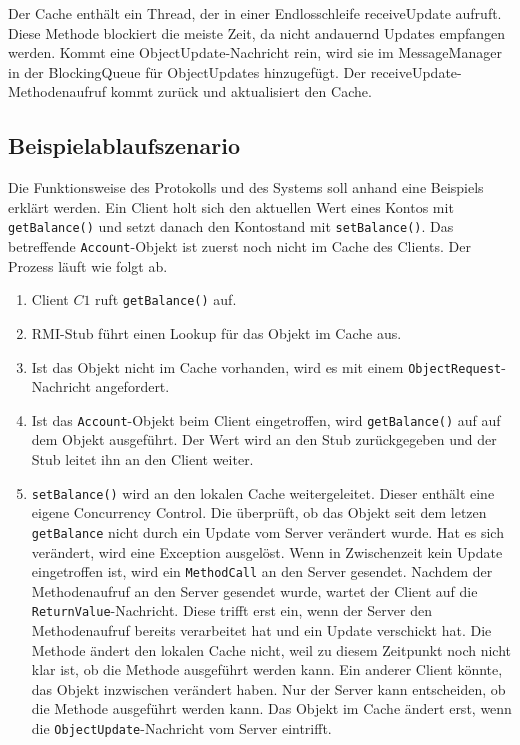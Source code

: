 Der Cache enthält ein Thread, der in einer Endlosschleife receiveUpdate aufruft. Diese Methode blockiert die meiste Zeit, da nicht andauernd Updates empfangen werden. Kommt eine ObjectUpdate-Nachricht rein, wird sie im MessageManager in der BlockingQueue für ObjectUpdates hinzugefügt. Der receiveUpdate-Methodenaufruf kommt zurück und aktualisiert den Cache.

\subsection{Beispielablaufszenario}
\label{sec:beisp}

Die Funktionsweise des Protokolls und des Systems soll anhand eine Beispiels erklärt werden. Ein Client holt sich den aktuellen Wert eines Kontos mit \texttt{getBalance()} und setzt danach den Kontostand mit \texttt{setBalance()}. Das betreffende \texttt{Account}-Objekt ist zuerst noch nicht im Cache des Clients. Der Prozess läuft wie folgt ab.

\begin{enumerate}
\item Client $C1$ ruft \verb+getBalance()+ auf.
\item RMI-Stub führt einen Lookup für das Objekt im Cache aus.
\item Ist das Objekt nicht im Cache vorhanden, wird es mit einem \texttt{Object\-Request}-Nachricht angefordert.
\item Ist das \texttt{Account}-Objekt beim Client eingetroffen, wird \verb+getBalance()+ auf auf dem Objekt ausgeführt. Der Wert wird an den Stub zurück\-gegeben und der Stub leitet ihn an den Client weiter.
\item \verb+setBalance()+ wird an den lokalen Cache weitergeleitet. Dieser enthält eine eigene Concurrency Control. Die überprüft, ob das Objekt seit dem letzen \verb+getBalance+ nicht durch ein Update vom Server verändert wurde. Hat es sich verändert, wird eine Exception ausgelöst. Wenn in Zwischenzeit kein Update eingetroffen ist, wird ein \texttt{MethodCall} an den Server gesendet. Nachdem der Methodenaufruf an den Server gesendet wurde, wartet der Client auf die \texttt{ReturnValue}-Nachricht. Diese trifft erst ein, wenn der Server den Methodenaufruf bereits verarbeitet hat und ein Update verschickt hat. Die Methode ändert den lokalen Cache nicht, weil zu diesem Zeitpunkt noch nicht klar ist, ob die Methode ausgeführt werden kann. Ein anderer Client könnte, das Objekt inzwischen verändert haben. Nur der Server kann entscheiden, ob die Methode ausgeführt werden kann. Das Objekt im Cache ändert erst, wenn die \texttt{ObjectUpdate}-Nachricht vom Server eintrifft.
\end{enumerate}

